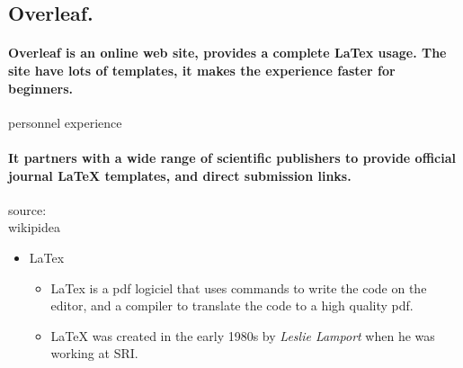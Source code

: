 \documentclass[a4paper,11pt]{report}
\begin{document}
\subsection{Overleaf.}
\paragraph{Overleaf is an online web site, provides a complete LaTex usage. The site have lots of templates, it makes the experience faster for beginners.}personnel experience
\paragraph{It partners with a wide range of scientific publishers to provide official journal LaTeX templates, and direct submission links.} source:\\wikipidea
\begin{itemize}
    \item LaTex
    \begin{itemize}
        \item LaTex is a pdf logiciel that uses commands to write the code on the editor, and a compiler to translate the code to a high quality pdf.
        
        
\end{itemize}
    \begin{itemize}
            \item LaTeX was created in the early 1980s by \textit{Leslie Lamport} when he was working at SRI.
        \end{itemize}
            
\end{itemize}
    
\end{document}
